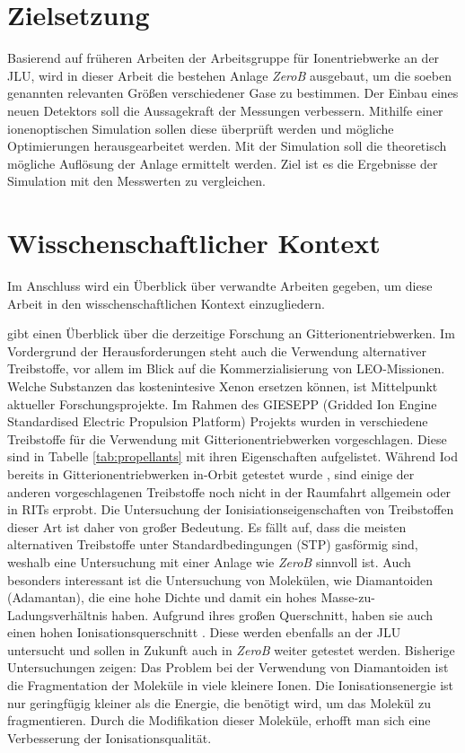 \section{Zielsetzung}
Basierend auf früheren Arbeiten der Arbeitsgruppe für Ionentriebwerke an der JLU, wird in dieser Arbeit die bestehen Anlage \textit{ZeroB} ausgebaut, um die soeben genannten relevanten Größen verschiedener Gase zu bestimmen. Der Einbau eines neuen Detektors soll die Aussagekraft der Messungen verbessern. Mithilfe einer ionenoptischen Simulation sollen diese überprüft werden und mögliche Optimierungen herausgearbeitet werden. Mit der Simulation soll die theoretisch mögliche Auflösung der Anlage ermittelt werden. Ziel ist es die Ergebnisse der Simulation mit den Messwerten zu vergleichen.  

\section{Wisschenschaftlicher Kontext}
Im Anschluss wird ein Überblick über verwandte Arbeiten gegeben, um diese Arbeit in den wisschenschaftlichen Kontext einzugliedern.

\cite{ion} gibt einen Überblick über die derzeitige Forschung an Gitterionentriebwerken. Im Vordergrund der Herausforderungen steht auch die Verwendung alternativer Treibstoffe, vor allem im Blick auf die Kommerzialisierung von LEO-Missionen. Welche Substanzen das kostenintesive Xenon ersetzen können, ist Mittelpunkt aktueller Forschungsprojekte. Im Rahmen des GIESEPP (Gridded Ion Engine Standardised Electric Propulsion Platform) Projekts wurden in \cite{Prop} verschiedene Treibstoffe für die Verwendung mit Gitterionentriebwerken vorgeschlagen. Diese sind in Tabelle \ref{tab:propellants} mit ihren Eigenschaften aufgelistet. Während Iod bereits in Gitterionentriebwerken in-Orbit getestet wurde \cite{Iodine}, sind einige der anderen vorgeschlagenen Treibstoffe noch nicht in der Raumfahrt allgemein oder in RITs erprobt. Die Untersuchung der Ionisiationseigenschaften von Treibstoffen dieser Art ist daher von großer Bedeutung. Es fällt auf, dass die meisten alternativen Treibstoffe unter Standardbedingungen (STP) gasförmig sind, weshalb eine Untersuchung mit einer Anlage wie \textit{ZeroB} sinnvoll ist. Auch besonders interessant ist die Untersuchung von Molekülen, wie Diamantoiden (Adamantan), die eine hohe Dichte und damit ein hohes Masse-zu-Ladungsverhältnis haben. Aufgrund ihres großen Querschnitt, haben sie auch einen hohen Ionisationsquerschnitt \cite{ion}. Diese werden ebenfalls an der JLU untersucht \cite{diamondoids} und sollen in Zukunft auch in \textit{ZeroB} weiter getestet werden. Bisherige Untersuchungen zeigen: Das Problem bei der Verwendung von Diamantoiden ist die Fragmentation der Moleküle in viele kleinere Ionen. Die Ionisationsenergie ist nur geringfügig kleiner als die Energie, die benötigt wird, um das Molekül zu fragmentieren. Durch die Modifikation dieser Moleküle, erhofft man sich eine Verbesserung der Ionisationsqualität. 

